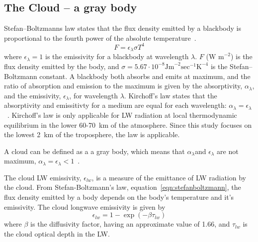 \subsection{The Cloud -- a gray body}
Stefan–Boltzmanns law states that the flux density emitted by a blackbody is proportional to the fourth power of the absolute temperature~\citep{Liou2002}. 
\begin{equation}
F = \epsilon_{\lambda} \sigma T^4
\label{eqn:stefanboltzmann}
\end{equation}
where $\epsilon_{\lambda} = 1$ is the emissivity for a blackbody at wavelength $\lambda$. $F$ ($\text{W~m}^{-2}$) is the flux density emitted  by the body, and $\sigma = 5.67\cdot 10^{-8} \text{Jm}^{-2}\text{sec}^{-1}\text{K}^{-4}$ is the Stefan–Boltzmann constant. A blackbody both absorbs and emits at maximum, and the ratio of absorption and emission to the maximum is given by the absorptivity, $\alpha_{\lambda}$, and the emissivity, $\epsilon_{\lambda}$, for wavelength $\lambda$. Kirchoff's law states that the absorptivity and emissitivty for a medium are equal for each wavelength: $\alpha_{\lambda} = \epsilon_{\lambda}$~\citep{Liou2002}. Kirchoff's law is only applicable for LW radiation at local thermodynamic equilibrium in the lower 60-70~km of the atmosphere. Since this study focuses on the lowest 2~km of the troposphere, the law is applicable.

A cloud can be defined as a a gray body, which means that $\alpha_{\lambda}$and $\epsilon_{\lambda}$ are not maximum, $\alpha_{\lambda}=\epsilon_{\lambda}<1$~\citep{Liou2002}.

The cloud LW emissivity, $\epsilon_{lw}$, is a measure of the emittance of LW radiation by the cloud. From Stefan-Boltzmann's law, equation~\ref{eqn:stefanboltzmann}, the flux density emitted by a body depends on the body's temperature and it's emissivity. The cloud longwave emissivity is given by
\begin{equation}
\epsilon_{lw} = 1 - \exp(-\beta \tau_{lw})
\label{eqn:epsilon_lw}
\end{equation}
where $\beta$ is the diffusivity factor, having an approximate value of 1.66, and $\tau_{lw}$ is the cloud optical depth in the LW.

